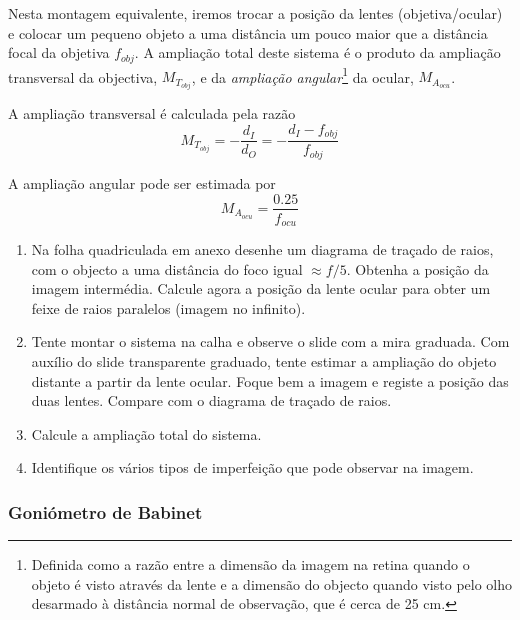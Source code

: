 \documentclass[a4paper,12pt]{article}      %
\begin{document}
Nesta montagem equivalente, iremos trocar a posição da lentes (objetiva/ocular) e colocar um pequeno objeto a uma distância um pouco maior que a distância focal da objetiva $f_{obj}$. A ampliação total deste sistema é o produto da ampliação transversal da objectiva, $M_{T_{obj}}$,  e da \emph{ampliação angular}\footnote{Definida como a razão entre a dimensão da imagem na retina quando o objeto é visto através da lente e a dimensão do objecto quando visto pelo olho desarmado à distância normal de observação, que é cerca de 25 cm.} da ocular, $M_{A_{ocu}}$.
 
A ampliação transversal é calculada pela razão
$$M_{T_{obj}}=-\frac{d_I}{d_O}=-\frac{d_I - f_{obj}}{f_{obj}}$$

A ampliação angular pode ser estimada por 
$$M_{A_{ocu}}= \frac{0.25}{f_{ocu}}$$

\begin{enumerate}
\item Na folha quadriculada em anexo desenhe um diagrama de traçado de raios, com o objecto a uma distância do foco igual $\approx f/5$. Obtenha a posição da imagem intermédia. Calcule agora a posição da lente ocular para obter um feixe de raios paralelos (imagem no infinito).
\item Tente montar o sistema na calha e observe o slide com a mira graduada. Com auxílio do slide transparente graduado, tente estimar a ampliação do  objeto distante a partir da lente ocular. Foque bem a imagem e registe a posição das duas lentes. Compare com o diagrama de traçado de raios.
\item Calcule a ampliação total do sistema.
\item Identifique os vários tipos de imperfeição que pode observar na imagem. 
\end{enumerate}

\subsubsection{\sf Goniómetro de Babinet}
\end{document}
